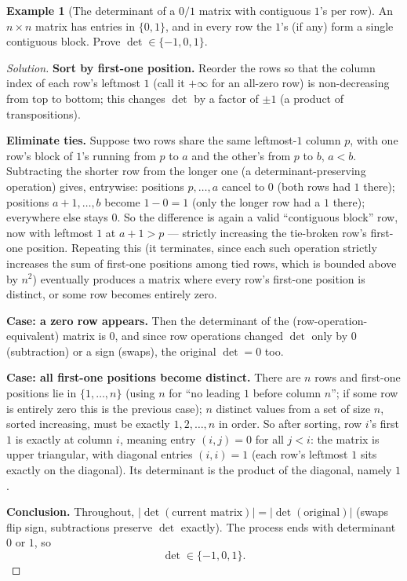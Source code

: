 \documentclass[11pt]{article}
\theoremstyle{definition}
\newtheorem{example}{Example}[section]
\begin{document}
\begin{example}[The determinant of a $0/1$ matrix with contiguous $1$'s per row]
An $n\times n$ matrix has entries in $\{0,1\}$, and in every row the $1$'s (if any) form a single contiguous block. Prove $\det\in\{-1,0,1\}$.
\end{example}
\begin{proof}[Solution]
\textbf{Sort by first-one position.} Reorder the rows so that the column index of each row's leftmost $1$ (call it $+\infty$ for an all-zero row) is non-decreasing from top to bottom; this changes $\det$ by a factor of $\pm1$ (a product of transpositions).

\textbf{Eliminate ties.} Suppose two rows share the same leftmost-$1$ column $p$, with one row's block of $1$'s running from $p$ to $a$ and the other's from $p$ to $b$, $a<b$. Subtracting the shorter row from the longer one (a determinant-preserving operation) gives, entrywise: positions $p,\dots,a$ cancel to $0$ (both rows had $1$ there); positions $a+1,\dots,b$ become $1-0=1$ (only the longer row had a $1$ there); everywhere else stays $0$. So the difference is again a valid ``contiguous block'' row, now with leftmost $1$ at $a+1>p$ — strictly increasing the tie-broken row's first-one position. Repeating this (it terminates, since each such operation strictly increases the sum of first-one positions among tied rows, which is bounded above by $n^2$) eventually produces a matrix where every row's first-one position is distinct, or some row becomes entirely zero.

\textbf{Case: a zero row appears.} Then the determinant of the (row-operation-equivalent) matrix is $0$, and since row operations changed $\det$ only by $0$ (subtraction) or a sign (swaps), the original $\det=0$ too.

\textbf{Case: all first-one positions become distinct.} There are $n$ rows and first-one positions lie in $\{1,\dots,n\}$ (using $n$ for ``no leading $1$ before column $n$''; if some row is entirely zero this is the previous case); $n$ distinct values from a set of size $n$, sorted increasing, must be exactly $1,2,\dots,n$ in order. So after sorting, row $i$'s first $1$ is exactly at column $i$, meaning entry $(i,j)=0$ for all $j<i$: the matrix is upper triangular, with diagonal entries $(i,i)=1$ (each row's leftmost $1$ sits exactly on the diagonal). Its determinant is the product of the diagonal, namely $1$.

\textbf{Conclusion.} Throughout, $|\det(\text{current matrix})|=|\det(\text{original})|$ (swaps flip sign, subtractions preserve $\det$ exactly). The process ends with determinant $0$ or $1$, so
\[
\boxed{\det\in\{-1,0,1\}}.
\]
\end{proof}
\end{document}
